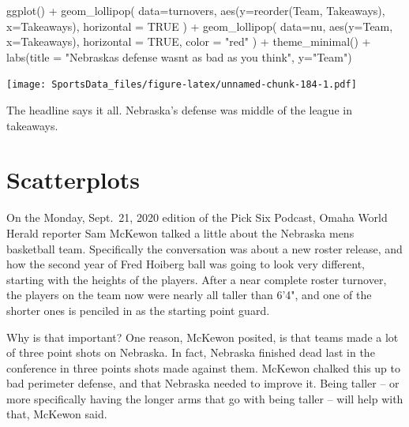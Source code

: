 \documentclass[
]{book}
\newenvironment{Shaded}{\begin{snugshade}}{\end{snugshade}}
\newcommand{\AttributeTok}[1]{\textcolor[rgb]{0.77,0.63,0.00}{#1}}
\newcommand{\ConstantTok}[1]{\textcolor[rgb]{0.00,0.00,0.00}{#1}}
\newcommand{\FunctionTok}[1]{\textcolor[rgb]{0.00,0.00,0.00}{#1}}
\newcommand{\NormalTok}[1]{#1}
\newcommand{\SpecialCharTok}[1]{\textcolor[rgb]{0.00,0.00,0.00}{#1}}
\newcommand{\StringTok}[1]{\textcolor[rgb]{0.31,0.60,0.02}{#1}}
\begin{document}
\begin{Shaded}
\begin{Highlighting}[]
\FunctionTok{ggplot}\NormalTok{() }\SpecialCharTok{+} 
  \FunctionTok{geom\_lollipop}\NormalTok{(}
    \AttributeTok{data=}\NormalTok{turnovers, }
    \FunctionTok{aes}\NormalTok{(}\AttributeTok{y=}\FunctionTok{reorder}\NormalTok{(Team, Takeaways), }\AttributeTok{x=}\NormalTok{Takeaways), }
    \AttributeTok{horizontal =} \ConstantTok{TRUE}
\NormalTok{    ) }\SpecialCharTok{+} 
  \FunctionTok{geom\_lollipop}\NormalTok{(}
    \AttributeTok{data=}\NormalTok{nu,}
    \FunctionTok{aes}\NormalTok{(}\AttributeTok{y=}\NormalTok{Team, }\AttributeTok{x=}\NormalTok{Takeaways),}
    \AttributeTok{horizontal =} \ConstantTok{TRUE}\NormalTok{,}
    \AttributeTok{color =} \StringTok{"red"}
\NormalTok{  ) }\SpecialCharTok{+} 
  \FunctionTok{theme\_minimal}\NormalTok{() }\SpecialCharTok{+} 
  \FunctionTok{labs}\NormalTok{(}\AttributeTok{title =} \StringTok{"Nebraska\textquotesingle{}s defense wasn\textquotesingle{}t as bad as you think"}\NormalTok{, }\AttributeTok{y=}\StringTok{"Team"}\NormalTok{)}
\end{Highlighting}
\end{Shaded}

\texttt{[image: SportsData\_files/figure-latex/unnamed-chunk-184-1.pdf]}

The headline says it all. Nebraska's defense was middle of the league in takeaways.

\hypertarget{scatterplots}{%
\chapter{Scatterplots}\label{scatterplots}}

On the Monday, Sept.~21, 2020 edition of the Pick Six Podcast, Omaha World Herald reporter Sam McKewon talked a little about the Nebraska mens basketball team. Specifically the conversation was about a new roster release, and how the second year of Fred Hoiberg ball was going to look very different, starting with the heights of the players. After a near complete roster turnover, the players on the team now were nearly all taller than 6'4", and one of the shorter ones is penciled in as the starting point guard.

Why is that important? One reason, McKewon posited, is that teams made a lot of three point shots on Nebraska. In fact, Nebraska finished dead last in the conference in three points shots made against them. McKewon chalked this up to bad perimeter defense, and that Nebraska needed to improve it. Being taller -- or more specifically having the longer arms that go with being taller -- will help with that, McKewon said.
\end{document}

